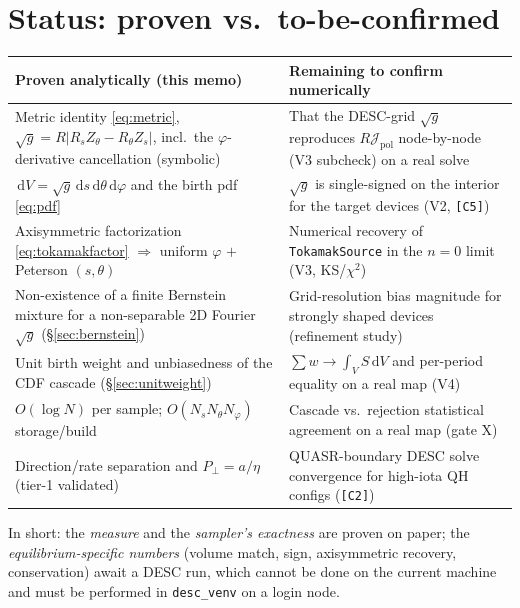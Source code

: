 \documentclass[11pt]{article}
\newcommand{\sg}{\sqrt{g}}
\newcommand{\Jpol}{\mathcal{J}_{\mathrm{pol}}}
\newcommand{\Rs}{R_{s}}
\newcommand{\Rt}{R_{\theta}}
\newcommand{\Zs}{Z_{s}}
\newcommand{\Zt}{Z_{\theta}}
\newcommand{\dd}{\,\mathrm{d}}
\newcommand{\code}[1]{\texttt{#1}}
\begin{document}
\section{Status: proven vs.\ to-be-confirmed}
\label{sec:status}

\begin{center}
\begin{tabular}{p{}p{}}
\hline
Proven analytically (this memo) & Remaining to confirm numerically\\
\hline
Metric identity \eqref{eq:metric}, $\sg=R|\Rs\Zt-\Rt\Zs|$, incl.\ the
$\varphi$-derivative cancellation (symbolic) & That the DESC-grid $\sg$ reproduces
$R\Jpol$ node-by-node (V3 subcheck) on a real solve\\[2pt]
$\dd V=\sg\dd s\dd\theta\dd\varphi$ and the birth pdf \eqref{eq:pdf} & $\sg$ is
single-signed on the interior for the target devices (V2, \code{[C5]})\\[2pt]
Axisymmetric factorization \eqref{eq:tokamakfactor} $\Rightarrow$ uniform $\varphi$
$+$ Peterson $(s,\theta)$ & Numerical recovery of \code{TokamakSource} in the $n{=}0$
limit (V3, KS/$\chi^2$)\\[2pt]
Non-existence of a finite Bernstein mixture for a non-separable 2D Fourier $\sg$
(\S\ref{sec:bernstein}) & Grid-resolution bias magnitude for strongly shaped devices
(refinement study)\\[2pt]
Unit birth weight and unbiasedness of the CDF cascade (\S\ref{sec:unitweight}) &
$\sum w\to\int_V S\dd V$ and per-period equality on a real map (V4)\\[2pt]
$O(\log N)$ per sample; $O(N_sN_\theta N_\varphi)$ storage/build & Cascade vs.\
rejection statistical agreement on a real map (gate X)\\[2pt]
Direction/rate separation and $P_\perp=a/\eta$ (tier-1 validated) & QUASR-boundary
DESC solve convergence for high-iota QH configs (\code{[C2]})\\
\hline
\end{tabular}
\end{center}

In short: the \emph{measure} and the \emph{sampler's exactness} are proven on paper;
the \emph{equilibrium-specific numbers} (volume match, sign, axisymmetric recovery,
conservation) await a DESC run, which cannot be done on the current machine and must
be performed in \code{desc\_venv} on a login node.

\end{document}
